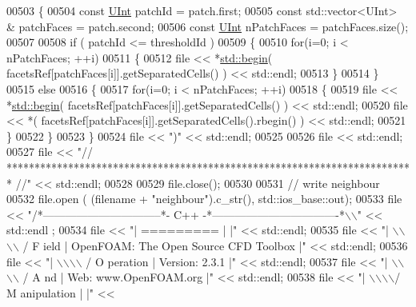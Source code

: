 \begin{DoxyCode}
00503     \{
00504         \textcolor{keyword}{const} \hyperlink{namespaceFVCode3D_a4bf7e328c75d0fd504050d040ebe9eda}{UInt} patchId = patch.first;
00505         \textcolor{keyword}{const} std::vector<UInt> & patchFaces = patch.second;
00506         \textcolor{keyword}{const} \hyperlink{namespaceFVCode3D_a4bf7e328c75d0fd504050d040ebe9eda}{UInt} nPatchFaces = patchFaces.size();
00507 
00508         \textcolor{keywordflow}{if} ( patchId <= thresholdId )
00509         \{
00510             \textcolor{keywordflow}{for}(i=0; i < nPatchFaces; ++i)
00511             \{
00512                 file << *\hyperlink{namespacestd_acec9a198880c12f51f02be95a298a48b}{std::begin}( facetsRef[patchFaces[i]].getSeparatedCells() ) << std::endl;
00513             \}
00514         \}
00515         \textcolor{keywordflow}{else}
00516         \{
00517             \textcolor{keywordflow}{for}(i=0; i < nPatchFaces; ++i)
00518             \{
00519                 file << *\hyperlink{namespacestd_acec9a198880c12f51f02be95a298a48b}{std::begin}( facetsRef[patchFaces[i]].getSeparatedCells() ) << std::endl;
00520                 file << *( facetsRef[patchFaces[i]].getSeparatedCells().rbegin() ) << std::endl;
00521             \}
00522         \}
00523     \}
00524     file << \textcolor{stringliteral}{")"} << std::endl;
00525 
00526     file << std::endl;
00527     file << \textcolor{stringliteral}{"// ************************************************************************* //"} << std::endl;
00528 
00529     file.close();
00530 
00531     \textcolor{comment}{// write neighbour}
00532     file.open ( (filename + \textcolor{stringliteral}{"neighbour"}).c\_str(), std::ios\_base::out);
00533     file << \textcolor{stringliteral}{"/*--------------------------------*- C++ -*----------------------------------*\(\backslash\)\(\backslash\)"} << std::endl
      ;
00534     file << \textcolor{stringliteral}{"| =========                 |                                                 |"} << std::endl;
00535     file << \textcolor{stringliteral}{"| \(\backslash\)\(\backslash\)\(\backslash\)\(\backslash\)      /  F ield         | OpenFOAM: The Open Source CFD Toolbox           |"} << 
      std::endl;
00536     file << \textcolor{stringliteral}{"|  \(\backslash\)\(\backslash\)\(\backslash\)\(\backslash\)    /   O peration     | Version:  2.3.1                                 |"} << 
      std::endl;
00537     file << \textcolor{stringliteral}{"|   \(\backslash\)\(\backslash\)\(\backslash\)\(\backslash\)  /    A nd           | Web:      www.OpenFOAM.org                      |"} << 
      std::endl;
00538     file << \textcolor{stringliteral}{"|    \(\backslash\)\(\backslash\)\(\backslash\)\(\backslash\)/     M anipulation  |                                                 |"} << 

\end{DoxyCode}
